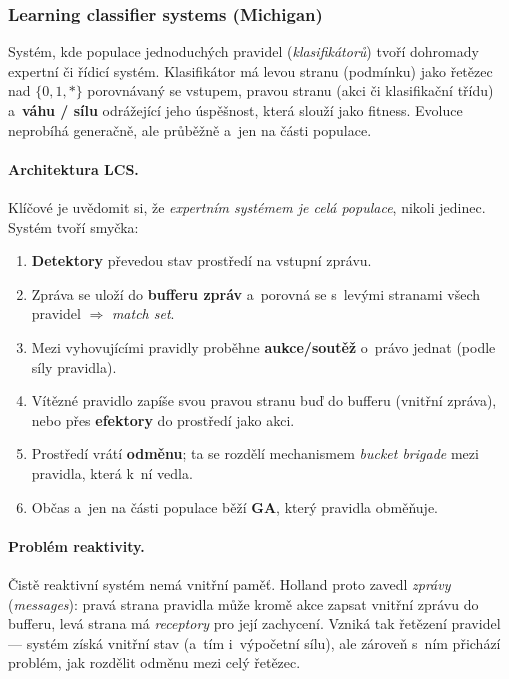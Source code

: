 \documentclass[11pt,a4paper]{article}
\theoremstyle{definition}
\begin{document}
\subsubsection{Learning classifier systems (Michigan)}

\begin{defbox}
Systém, kde populace jednoduchých pravidel (\emph{klasifikátorů}) tvoří
dohromady expertní či řídicí systém. Klasifikátor má levou stranu
(podmínku) jako řetězec nad $\{0,1,*\}$ porovnávaný se vstupem, pravou stranu
(akci či klasifikační třídu) a~\textbf{váhu / sílu} odrážející jeho úspěšnost,
která slouží jako fitness. Evoluce neprobíhá generačně, ale průběžně a~jen na
části populace.
\end{defbox}

\paragraph{Architektura LCS.} Klíčové je uvědomit si, že \emph{expertním
systémem je celá populace}, nikoli jedinec. Systém tvoří smyčka:
\begin{enumerate}
\item \textbf{Detektory} převedou stav prostředí na vstupní zprávu.
\item Zpráva se uloží do \textbf{bufferu zpráv} a~porovná se s~levými stranami
  všech pravidel $\Rightarrow$ \emph{match set}.
\item Mezi vyhovujícími pravidly proběhne \textbf{aukce/soutěž} o~právo jednat
  (podle síly pravidla).
\item Vítězné pravidlo zapíše svou pravou stranu buď do bufferu (vnitřní
  zpráva), nebo přes \textbf{efektory} do prostředí jako akci.
\item Prostředí vrátí \textbf{odměnu}; ta se rozdělí mechanismem
  \emph{bucket brigade} mezi pravidla, která k~ní vedla.
\item Občas a~jen na části populace běží \textbf{GA}, který pravidla obměňuje.
\end{enumerate}

\paragraph{Problém reaktivity.} Čistě reaktivní systém nemá vnitřní paměť.
Holland proto zavedl \emph{zprávy} (\emph{messages}): pravá strana pravidla
může kromě akce zapsat vnitřní zprávu do bufferu, levá strana má
\emph{receptory} pro její zachycení. Vzniká tak řetězení pravidel --- systém
získá vnitřní stav (a~tím i~výpočetní sílu), ale zároveň s~ním přichází
problém, jak rozdělit odměnu mezi celý řetězec.
\end{document}
